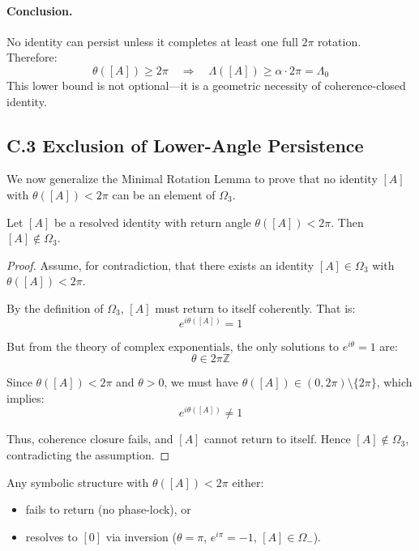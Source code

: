 \paragraph{Conclusion.}
No identity can persist unless it completes at least one full $2\pi$ rotation. Therefore:
\[
\theta([A]) \geq 2\pi
\quad \Rightarrow \quad
\Lambda([A]) \geq \alpha \cdot 2\pi = \Lambda_0
\]
This lower bound is not optional—it is a geometric necessity of coherence-closed identity.

\subsection*{C.3 \quad Exclusion of Lower-Angle Persistence}
\label{sec:c3-lower-angle-exclusion}

We now generalize the Minimal Rotation Lemma to prove that no identity $[A]$ with $\theta([A]) < 2\pi$ can be an element of $\Omega_3$.

\begin{proposition}
Let $[A]$ be a resolved identity with return angle $\theta([A]) < 2\pi$. Then $[A] \notin \Omega_3$.
\end{proposition}

\begin{proof}
Assume, for contradiction, that there exists an identity $[A] \in \Omega_3$ with $\theta([A]) < 2\pi$.

By the definition of $\Omega_3$, $[A]$ must return to itself coherently. That is:
\[
e^{i\theta([A])} = 1
\]

But from the theory of complex exponentials, the only solutions to $e^{i\theta} = 1$ are:
\[
\theta \in 2\pi \mathbb{Z}
\]

Since $\theta([A]) < 2\pi$ and $\theta > 0$, we must have $\theta([A]) \in (0, 2\pi) \setminus \{2\pi\}$, which implies:
\[
e^{i\theta([A])} \ne 1
\]

Thus, coherence closure fails, and $[A]$ cannot return to itself. Hence $[A] \notin \Omega_3$, contradicting the assumption.

\end{proof}

\begin{corollary}
Any symbolic structure with $\theta([A]) < 2\pi$ either:
\begin{itemize}
    \item fails to return (no phase-lock), or
    \item resolves to $[0]$ via inversion ($\theta = \pi$, $e^{i\pi} = -1$, $[A] \in \Omega_-$).
\end{itemize}
\end{corollary}

